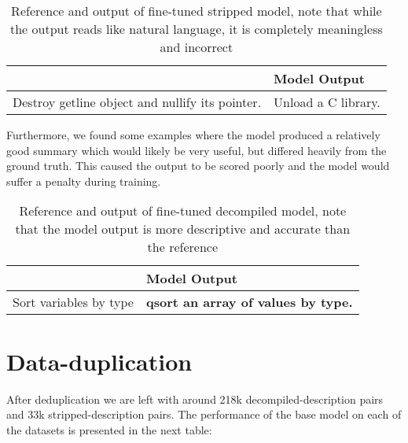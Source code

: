 \label{tab:syntax}
\begin{table}[!h]
\centering
\begin{tabular}{ll}
\hline
\rowcolor[HTML]{9B9B9B} 
\multicolumn{1}{|l}{\cellcolor[HTML]{9B9B9B}Reference} & \multicolumn{1}{l|}{\cellcolor[HTML]{9B9B9B}Model Output}    \\ \hline
Destroy getline object and nullify its pointer.               & Unload a C library.
\end{tabular}
\caption{Reference and output of fine-tuned stripped model, note that while the output reads like natural language, it is completely meaningless and incorrect}
\end{table}

Furthermore, we found some examples where the model produced a relatively good summary which would likely be very useful, but differed heavily from the ground truth. This caused the output to be scored poorly and the model would suffer a penalty during training.
\label{tab:betterOutput}
\begin{table}[!h]
\centering
\begin{tabular}{ll}
\hline
\rowcolor[HTML]{9B9B9B} 
\multicolumn{1}{|l}{\cellcolor[HTML]{9B9B9B}Reference} & \multicolumn{1}{l|}{\cellcolor[HTML]{9B9B9B}Model Output} \\ \hline
Sort variables by type                                 & \textbf{qsort an array of values by type.}        
\end{tabular}
\caption{Reference and output of fine-tuned decompiled model, note that the model output is more descriptive and accurate than the reference}
\end{table}


\section{Data-duplication}
After deduplication we are left with around 218k decompiled-description pairs and 33k stripped-description pairs. The performance of the base model on each of the datasets is presented in the next table:

